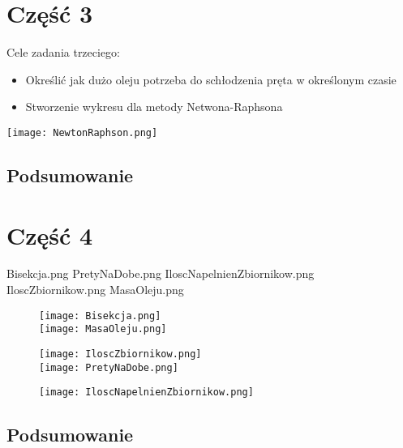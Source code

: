 \documentclass[varwidth,12pt,a4paper]{article}
\begin{document}
\section{Część 3}

Cele zadania trzeciego:

\begin{itemize}
  \item Określić jak dużo oleju potrzeba do schłodzenia pręta w określonym czasie
  \item Stworzenie wykresu dla metody Netwona-Raphsona
\end{itemize}

\texttt{[image: NewtonRaphson.png]} 



\subsection{Podsumowanie}

\section{Część 4}

Bisekcja.png
PretyNaDobe.png
IloscNapelnienZbiornikow.png
IloscZbiornikow.png
MasaOleju.png

\begin{figure}[H]
    \texttt{[image: Bisekcja.png]} \\
    \texttt{[image: MasaOleju.png]} \\
\end{figure}

\begin{figure}[H]
    \texttt{[image: IloscZbiornikow.png]} \\
    \texttt{[image: PretyNaDobe.png]} \\
\end{figure}

\begin{figure}[H]
    \texttt{[image: IloscNapelnienZbiornikow.png]} \\
\end{figure}

\subsection{Podsumowanie}
\end{document}
